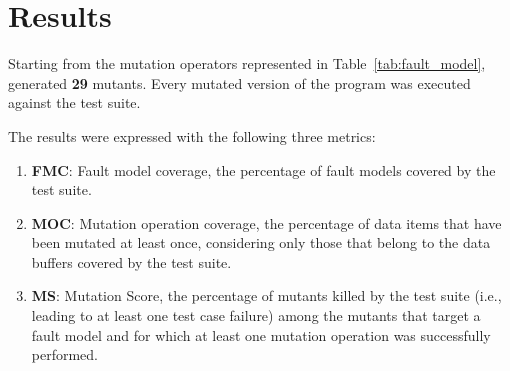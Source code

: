 
\chapter{Results}


Starting from the mutation operators represented in Table~\ref{tab:fault_model}, \DAMA generated \textbf{29} mutants. Every mutated version of the program was executed against the \case test suite.

The results were expressed with the following three metrics:
\begin{enumerate}
\item \textbf{FMC}: Fault model coverage, the percentage of fault models covered by the test suite.
\item \textbf{MOC}: Mutation operation coverage, the percentage of data items that have been mutated at least once, considering only those that belong to the data buffers covered by the test suite.
\item \textbf{MS}: Mutation Score, the percentage of mutants killed by the test suite (i.e., leading to at least one test case failure) among the mutants that target a fault model and for which at least one mutation operation was successfully performed.
\end{enumerate}


